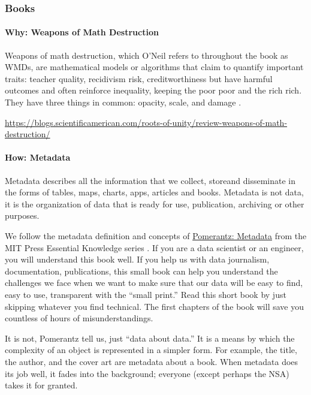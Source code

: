 \documentclass[
  fontsize=13pt,
  english,
  a4paper,
  openany, a4paper, oneside]{article}
\begin{document}
\hypertarget{books}{%
\subsubsection{Books}\label{books}}

\hypertarget{why-weapons-of-math-destruction}{%
\paragraph{Why: Weapons of Math Destruction}\label{why-weapons-of-math-destruction}}

Weapons of math destruction, which O'Neil refers to throughout the book as WMDs, are mathematical models or algorithms that claim to quantify important traits: teacher quality, recidivism risk, creditworthiness but have harmful outcomes and often reinforce inequality, keeping the poor poor and the rich rich. They have three things in common: opacity, scale, and damage \citep{weapons_of_math_destruction}.

\url{https://blogs.scientificamerican.com/roots-of-unity/review-weapons-of-math-destruction/}

\hypertarget{how-metadata}{%
\paragraph{How: Metadata}\label{how-metadata}}

Metadata describes all the information that we collect, storeand disseminate in the forms of tables, maps, charts, apps, articles and books. Metadata is not data, it is the organization of data that is ready for use, publication, archiving or other purposes.

We follow the metadata definition and concepts of \href{https://mitpress.mit.edu/books/metadata}{Pomerantz: Metadata} from the MIT Press Essential Knowledge series \citep{pomerantz_2015}. If you are a data scientist or an engineer, you will understand this book well. If you help us with data journalism, documentation, publications, this small book can help you understand the challenges we face when we want to make sure that our data will be easy to find, easy to use, transparent with the ``small print.'' Read this short book by just skipping whatever you find technical. The first chapters of the book will save you countless of hours of misunderstandings.

It is not, Pomerantz tell us, just ``data about data.'' It is a means by which the complexity of an object is represented in a simpler form. For example, the title, the author, and the cover art are metadata about a book. When metadata does its job well, it fades into the background; everyone (except perhaps the NSA) takes it for granted.
\end{document}
